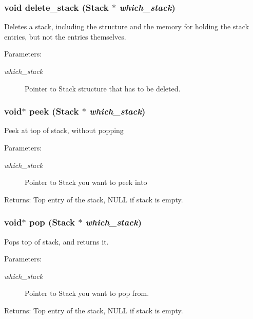 \subsubsection{\setlength{\rightskip}{0pt plus 5cm}void delete\_\-stack (\bf{Stack} $\ast$ {\em which\_\-stack})}\label{stack_8c_f3285173a95add78b1910a3267378ed6}


Deletes a stack, including the structure and the memory for holding the stack entries, but not the entries themselves. \begin{Desc}
\item[Parameters:]
\begin{description}
\item[{\em which\_\-stack}]Pointer to Stack structure that has to be deleted. \end{description}
\end{Desc}
\subsubsection{\setlength{\rightskip}{0pt plus 5cm}void$\ast$ peek (\bf{Stack} $\ast$ {\em which\_\-stack})}\label{stack_8c_e6d178d94e76c529952cc01831026670}


Peek at top of stack, without popping \begin{Desc}
\item[Parameters:]
\begin{description}
\item[{\em which\_\-stack}]Pointer to Stack you want to peek into \end{description}
\end{Desc}
\begin{Desc}
\item[Returns:]Top entry of the stack, NULL if stack is empty. \end{Desc}
\subsubsection{\setlength{\rightskip}{0pt plus 5cm}void$\ast$ pop (\bf{Stack} $\ast$ {\em which\_\-stack})}\label{stack_8c_306d7b021c4174d96da78af2105c066b}


Pops top of stack, and returns it. \begin{Desc}
\item[Parameters:]
\begin{description}
\item[{\em which\_\-stack}]Pointer to Stack you want to pop from. \end{description}
\end{Desc}
\begin{Desc}
\item[Returns:]Top entry of the stack, NULL if stack is empty. \end{Desc}
